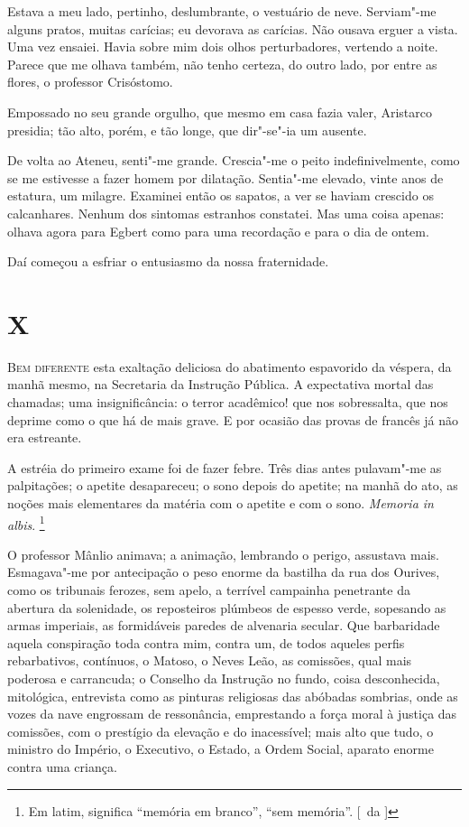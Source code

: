 Estava a meu
lado, pertinho, deslumbrante, o vestuário de neve. Serviam"-me alguns
pratos, muitas carícias; eu devorava as carícias. Não ousava erguer a
vista. Uma vez ensaiei. Havia sobre mim dois olhos perturbadores,
vertendo a noite. Parece que me olhava também, não tenho certeza, do
outro lado, por entre as flores, o professor Crisóstomo. 

Empossado no
seu grande orgulho, que mesmo em casa fazia valer, Aristarco presidia;
tão alto, porém, e tão longe, que dir"-se"-ia um ausente. 

De volta ao Ateneu, senti"-me grande. 
Crescia"-me o peito indefinivelmente, 
como se me estivesse a fazer homem por dilatação. 
Sentia"-me elevado, vinte
anos de estatura, um milagre. Examinei então os sapatos, a ver se
haviam crescido os calcanhares. Nenhum dos sintomas estranhos
constatei. Mas uma coisa apenas: olhava agora para Egbert como para uma
recordação e para o dia de ontem. 

Daí começou a esfriar o entusiasmo da nossa fraternidade. 

\section{X}

\noindent\textsc{Bem diferente} esta exaltação deliciosa do abatimento espavorido da
véspera, da manhã mesmo, na Secretaria da Instrução Pública. A
expectativa mortal das chamadas; uma insignificância: o terror
acadêmico! que nos sobressalta, que nos deprime como o que há de mais
grave. E por ocasião das provas de francês já não era estreante. 

A estréia do primeiro exame foi de fazer febre. Três dias antes
pulavam"-me as palpitações; o apetite desapareceu; o sono depois do
apetite; na manhã do ato, as noções mais elementares da matéria com o
apetite e com o sono. \textit{Memoria in albis}.
\footnote{ Em latim, significa ``memória em branco'', ``sem memória''. [~da ]} 

O professor Mânlio animava; a
animação, lembrando o perigo, assustava mais. Esmagava"-me por
antecipação o peso enorme da bastilha da rua dos Ourives, como os
tribunais ferozes, sem apelo, a terrível campainha penetrante da
abertura da solenidade, os reposteiros plúmbeos de espesso verde,
sopesando as armas imperiais, as formidáveis paredes de alvenaria
secular. Que barbaridade aquela conspiração toda contra mim, contra um,
de todos aqueles perfis rebarbativos, contínuos, o Matoso, o Neves
Leão, as comissões, qual mais poderosa e carrancuda; o Conselho da
Instrução no fundo, coisa desconhecida, mitológica, entrevista como as
pinturas religiosas das abóbadas sombrias, onde as vozes da nave
engrossam de ressonância, emprestando a força moral à justiça das
comissões, com o prestígio da elevação e do inacessível; mais alto que tudo, 
o ministro do Império, o Executivo, o Estado, a Ordem Social, aparato enorme
contra uma criança. 

